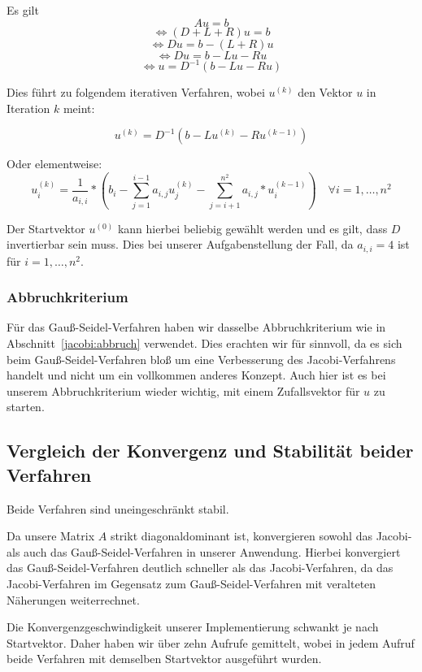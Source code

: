 \documentclass{article}
\begin{document}
Es gilt
$$Au = b$$
$$\Leftrightarrow (D+L+R)u = b$$
$$\Leftrightarrow Du = b - (L+R)u$$
$$\Leftrightarrow Du= b - Lu - Ru$$
$$\Leftrightarrow u = D^{-1} (b - Lu - Ru)$$

Dies führt zu folgendem iterativen Verfahren, wobei $u^{(k)}$ den Vektor $u$ in Iteration $k$ meint:

$$u^{(k)} = D^{-1} \left(b - Lu^{(k)} - Ru^{(k-1)}\right)$$

Oder elementweise:
$$u_i^{(k)} = \frac{1}{a_{i,i}} * \left(b_i - \sum_{j=1}^{i-1}{a_{i,j} u_j^{(k)}} - \sum_{j=i+1}^{n^2}{a_{i,j}*u_i^{(k-1)}}\right) \quad \forall i = 1, \ldots, n^2$$

Der Startvektor $u^{(0)}$ kann hierbei beliebig gewählt werden und es gilt, dass $D$ invertierbar sein muss. Dies bei unserer Aufgabenstellung der Fall, da $a_{i,i} = 4$ ist für $i = 1, \ldots, n^2$.



\subsubsection{Abbruchkriterium}
Für das Gauß-Seidel-Verfahren haben wir dasselbe Abbruchkriterium wie in Abschnitt~\ref{jacobi:abbruch} verwendet. Dies erachten wir für sinnvoll, da es sich beim Gauß-Seidel-Verfahren bloß um eine Verbesserung des Jacobi-Verfahrens handelt und nicht um ein vollkommen anderes Konzept. Auch hier ist es bei unserem Abbruchkriterium wieder wichtig, mit einem Zufallsvektor für $u$ zu starten.

\subsection{Vergleich der Konvergenz und Stabilität beider Verfahren}\label{konvergenz}
Beide Verfahren sind uneingeschränkt stabil.

Da unsere Matrix $A$ strikt diagonaldominant ist, konvergieren sowohl das Jacobi- als auch das Gauß-Seidel-Verfahren in unserer Anwendung. Hierbei konvergiert das Gauß-Seidel-Verfahren deutlich schneller als das Jacobi-Verfahren, da das Jacobi-Verfahren im Gegensatz zum Gauß-Seidel-Verfahren mit veralteten Näherungen weiterrechnet.

Die Konvergenzgeschwindigkeit unserer Implementierung schwankt je nach Startvektor. Daher haben wir über zehn Aufrufe gemittelt, wobei in jedem Aufruf beide Verfahren mit demselben Startvektor ausgeführt wurden. 
\end{document}
